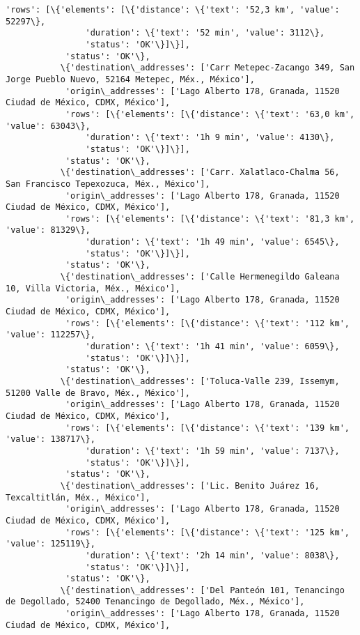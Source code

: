 \documentclass[11pt]{article}
\begin{document}
\begin{Verbatim}[commandchars=\\\{\}]
            'rows': [\{'elements': [\{'distance': \{'text': '52,3 km', 'value': 52297\},
                'duration': \{'text': '52 min', 'value': 3112\},
                'status': 'OK'\}]\}],
            'status': 'OK'\},
           \{'destination\_addresses': ['Carr Metepec-Zacango 349, San Jorge Pueblo Nuevo, 52164 Metepec, Méx., México'],
            'origin\_addresses': ['Lago Alberto 178, Granada, 11520 Ciudad de México, CDMX, México'],
            'rows': [\{'elements': [\{'distance': \{'text': '63,0 km', 'value': 63043\},
                'duration': \{'text': '1h 9 min', 'value': 4130\},
                'status': 'OK'\}]\}],
            'status': 'OK'\},
           \{'destination\_addresses': ['Carr. Xalatlaco-Chalma 56, San Francisco Tepexozuca, Méx., México'],
            'origin\_addresses': ['Lago Alberto 178, Granada, 11520 Ciudad de México, CDMX, México'],
            'rows': [\{'elements': [\{'distance': \{'text': '81,3 km', 'value': 81329\},
                'duration': \{'text': '1h 49 min', 'value': 6545\},
                'status': 'OK'\}]\}],
            'status': 'OK'\},
           \{'destination\_addresses': ['Calle Hermenegildo Galeana 10, Villa Victoria, Méx., México'],
            'origin\_addresses': ['Lago Alberto 178, Granada, 11520 Ciudad de México, CDMX, México'],
            'rows': [\{'elements': [\{'distance': \{'text': '112 km', 'value': 112257\},
                'duration': \{'text': '1h 41 min', 'value': 6059\},
                'status': 'OK'\}]\}],
            'status': 'OK'\},
           \{'destination\_addresses': ['Toluca-Valle 239, Issemym, 51200 Valle de Bravo, Méx., México'],
            'origin\_addresses': ['Lago Alberto 178, Granada, 11520 Ciudad de México, CDMX, México'],
            'rows': [\{'elements': [\{'distance': \{'text': '139 km', 'value': 138717\},
                'duration': \{'text': '1h 59 min', 'value': 7137\},
                'status': 'OK'\}]\}],
            'status': 'OK'\},
           \{'destination\_addresses': ['Lic. Benito Juárez 16, Texcaltitlán, Méx., México'],
            'origin\_addresses': ['Lago Alberto 178, Granada, 11520 Ciudad de México, CDMX, México'],
            'rows': [\{'elements': [\{'distance': \{'text': '125 km', 'value': 125119\},
                'duration': \{'text': '2h 14 min', 'value': 8038\},
                'status': 'OK'\}]\}],
            'status': 'OK'\},
           \{'destination\_addresses': ['Del Panteón 101, Tenancingo de Degollado, 52400 Tenancingo de Degollado, Méx., México'],
            'origin\_addresses': ['Lago Alberto 178, Granada, 11520 Ciudad de México, CDMX, México'],

\end{Verbatim}
\end{document}
